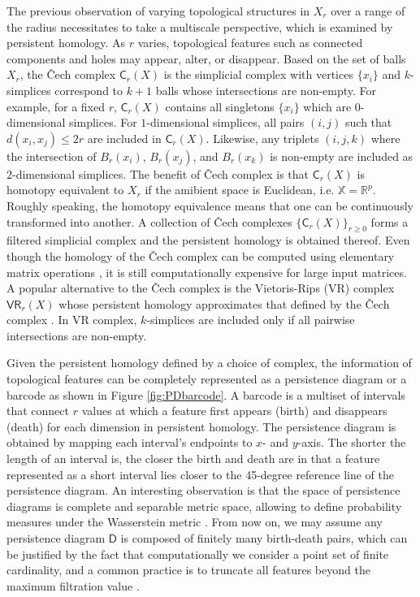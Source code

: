 \documentclass[12pt]{article}
\newcommand{\bbX}{\mathbb{X}}
\newcommand{\sfD}{\mathsf{D}} %
\newcommand{\sfC}{\mathsf{C}}   %
\newcommand{\sfVR}{\mathsf{VR}} %
\begin{document}
The previous observation of varying topological structures in $X_r$ over a range of the radius necessitates to take a multiscale perspective, which is examined by persistent homology. As $r$ varies, topological features such as connected components and holes may appear, alter, or disappear. Based on the set of balls $X_r$, the \v{C}ech complex $\sfC_r (X)$ is the simplicial complex with vertices $\lbrace x_i\rbrace $ and $k$-simplices correspond to $k+1$ balls whose intersections are non-empty. For example, for a fixed $r$, $\sfC_r (X)$ contains all singletons $\lbrace x_i\rbrace$ which are $0$-dimensional simplices. For $1$-dimensional simplices, all pairs $(i,j)$ such that $ d(x_i, x_j) \leq 2r$ are included in $\sfC_r (X)$. Likewise, any triplets $(i,j,k)$ where the intersection of $B_r (x_i)$, $B_r (x_j)$, and $B_r (x_k)$ is non-empty are included as $2$-dimensional simplices. The benefit of \v{C}ech complex is that $\sfC_r (X)$ is homotopy equivalent to $X_r$ if the amibient space is Euclidean, i.e. $\bbX = \mathbb{R}^p$. Roughly speaking, the homotopy equivalence means that one can be continuously transformed into another. A collection of \v{C}ech complexes $\lbrace \sfC_r (X)\rbrace_{r \geq 0}$ forms a filtered simplicial complex and the persistent homology is obtained thereof. Even though the homology of the \v{C}ech complex can be computed using elementary matrix operations \citep{edelsbrunner_computational_2010}, it is still computationally expensive for large input matrices. A popular alternative to the \v{C}ech complex is the Vietoris-Rips (VR) complex $\sfVR_r (X)$ whose persistent homology approximates that defined by the \v{C}ech complex \citep{de_silva_coverage_2007}. In VR complex, $k$-simplices are included only if all pairwise intersections are non-empty. 

Given the persistent homology defined by a choice of complex, the information of topological features can be completely represented as a persistence diagram \citep{cohen-steiner_stability_2007} or a barcode \citep{collins_barcode_2004} as shown in Figure \ref{fig:PDbarcode}. A barcode is a multiset of intervals that connect $r$ values at which a feature first appears (birth) and disappears (death) for each dimension in persistent homology. The persistence diagram is obtained by mapping each interval's endpoints to $x$- and $y$-axis. The shorter the length of an interval is, the closer the birth and death are in that a feature represented as a short interval lies closer to the 45-degree reference line of the persistence diagram. An interesting observation is that the space of persistence diagrams is complete and separable metric space, allowing to define probability measures under the Wasserstein metric \citep{mileyko_probability_2011}. From now on, we may assume any persistence diagram $\sfD$ is composed of finitely many birth-death pairs, which can be justified by the fact that computationally we consider a point set of finite cardinality, and a common practice is to truncate all features beyond the maximum filtration value \citep{baas_persistence_2020}.
\end{document}
